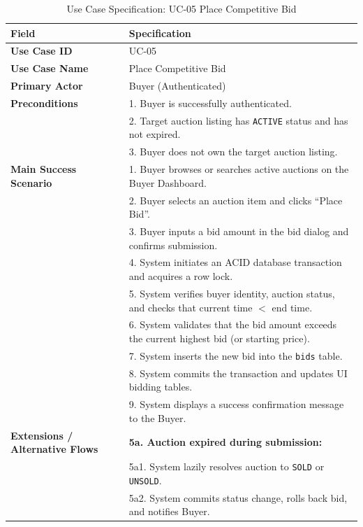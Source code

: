 \begin{table}[H]
\centering
\small
\caption{Use Case Specification: UC-05 Place Competitive Bid}
\label{tab:uc_bid}
\begin{tabularx}{\textwidth}{p{3.5cm}X}
\toprule
\textbf{Field} & \textbf{Specification} \\
\midrule
\textbf{Use Case ID} & UC-05 \\
\textbf{Use Case Name} & Place Competitive Bid \\
\textbf{Primary Actor} & Buyer (Authenticated) \\
\textbf{Preconditions} & 1. Buyer is successfully authenticated.\\
                       & 2. Target auction listing has \texttt{ACTIVE} status and has not expired.\\
                       & 3. Buyer does not own the target auction listing. \\
\textbf{Main Success Scenario} & 1. Buyer browses or searches active auctions on the Buyer Dashboard.\\
                               & 2. Buyer selects an auction item and clicks ``Place Bid''.\\
                               & 3. Buyer inputs a bid amount in the bid dialog and confirms submission.\\
                               & 4. System initiates an ACID database transaction and acquires a row lock.\\
                               & 5. System verifies buyer identity, auction status, and checks that current time $<$ end time.\\
                               & 6. System validates that the bid amount exceeds the current highest bid (or starting price).\\
                               & 7. System inserts the new bid into the \texttt{bids} table.\\
                               & 8. System commits the transaction and updates UI bidding tables.\\
                               & 9. System displays a success confirmation message to the Buyer.\\
\textbf{Extensions / Alternative Flows} & \textbf{5a. Auction expired during submission:}\\
                                        & \quad 5a1. System lazily resolves auction to \texttt{SOLD} or \texttt{UNSOLD}.\\
                                        & \quad 5a2. System commits status change, rolls back bid, and notifies Buyer.\\

\end{tabularx}
\end{table}
